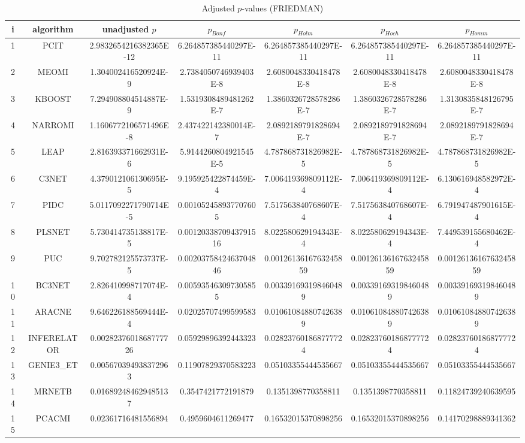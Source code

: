 \documentclass[a4paper,10pt]{article}
\begin{document}
\begin{landscape}
\begin{table}[!htp]
\centering\scriptsize
\caption{Adjusted $p$-values (FRIEDMAN)}
\begin{tabular}{ccccccc}
i&algorithm&unadjusted $p$&$p_{Bonf}$&$p_{Holm}$&$p_{Hoch}$&$p_{Homm}$\\
\hline
1&PCIT&2.9832654216382365E-12&6.264857385440297E-11&6.264857385440297E-11&6.264857385440297E-11&6.264857385440297E-11\\
2&MEOMI&1.304002416520924E-9&2.7384050746939403E-8&2.6080048330418478E-8&2.6080048330418478E-8&2.6080048330418478E-8\\
3&KBOOST&7.294908804514887E-9&1.5319308489481262E-7&1.3860326728578286E-7&1.3860326728578286E-7&1.3130835848126795E-7\\
4&NARROMI&1.1606772106571496E-8&2.437422142380014E-7&2.0892189791828694E-7&2.0892189791828694E-7&2.0892189791828694E-7\\
5&LEAP&2.816393371662931E-6&5.9144260804921545E-5&4.787868731826982E-5&4.787868731826982E-5&4.787868731826982E-5\\
6&C3NET&4.379012106130695E-5&9.195925422874459E-4&7.006419369809112E-4&7.006419369809112E-4&6.130616948582972E-4\\
7&PIDC&5.0117092271790714E-5&0.001052458937707605&7.517563840768607E-4&7.517563840768607E-4&6.791947487901615E-4\\
8&PLSNET&5.730414735138817E-5&0.0012033870943791516&8.022580629194343E-4&8.022580629194343E-4&7.449539155680462E-4\\
9&PUC&9.702782125573737E-5&0.0020375842463704846&0.0012613616763245859&0.0012613616763245859&0.0012613616763245859\\
10&BC3NET&2.826410998717074E-4&0.005935463097305855&0.003391693198460489&0.003391693198460489&0.003391693198460489\\
11&ARACNE&9.646226188569444E-4&0.02025707499599583&0.010610848807426389&0.010610848807426389&0.010610848807426389\\
12&INFERELATOR&0.0028237601868777726&0.05929896392443323&0.028237601868777724&0.028237601868777724&0.028237601868777724\\
13&GENIE3_ET&0.005670394938372963&0.11907829370583223&0.05103355444535667&0.05103355444535667&0.05103355444535667\\
14&MRNETB&0.016892484629485137&0.3547421772191879&0.1351398770358811&0.1351398770358811&0.11824739240639595\\
15&PCACMI&0.02361716481556894&0.4959604611269477&0.16532015370898256&0.16532015370898256&0.14170298889341362\\

\end{tabular}
\end{table}
\end{landscape}
\end{document}
